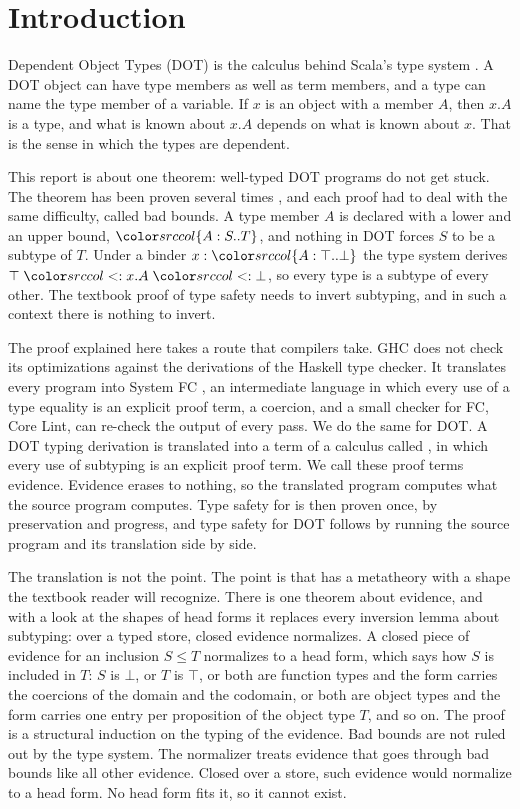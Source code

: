 \mathplain
\section{Introduction}\label{sec:intro}

Dependent Object Types (DOT) is the calculus behind Scala's type system \cite{amin2016essence}. A DOT object can have type members as well as term members, and a type can name the type member of a variable. If $x$ is an object with a member $A$, then $x.A$ is a type, and what is known about $x.A$ depends on what is known about $x$. That is the sense in which the types are dependent.

This report is about one theorem: well-typed DOT programs do not get stuck. The theorem has been proven several times \cite{amin2016essence,rompf2016soundness,rapoport2017simple,amin2017definitional,giarrusso2020scala}, and each proof had to deal with the same difficulty, called bad bounds. A type member $A$ is declared with a lower and an upper bound, $\dtyp{A}{S}{T}$, and nothing in DOT forces $S$ to be a subtype of $T$. Under a binder $x : \dtyp{A}{\top}{\bot}$ the type system derives $\top \sub x.A \sub \bot$, so every type is a subtype of every other. The textbook proof of type safety needs to invert subtyping, and in such a context there is nothing to invert.

The proof explained here takes a route that compilers take. GHC does not check its optimizations against the derivations of the Haskell type checker. It translates every program into System FC \cite{sulzmann2007fc}, an intermediate language in which every use of a type equality is an explicit proof term, a coercion, and a small checker for FC, Core Lint, can re-check the output of every pass. We do the same for DOT. A DOT typing derivation is translated into a term of a calculus called \FCdot, in which every use of subtyping is an explicit proof term. We call these proof terms evidence. Evidence erases to nothing, so the translated program computes what the source program computes. Type safety for \FCdot is then proven once, by preservation and progress, and type safety for DOT follows by running the source program and its translation side by side.

The translation is not the point. The point is that \FCdot has a metatheory with a shape the textbook reader will recognize. There is one theorem about evidence, and with a look at the shapes of head forms it replaces every inversion lemma about subtyping: over a typed store, closed evidence normalizes. A closed piece of evidence for an inclusion $S \le T$ normalizes to a head form, which says how $S$ is included in $T$: $S$ is $\bot$, or $T$ is $\top$, or both are function types and the form carries the coercions of the domain and the codomain, or both are object types and the form carries one entry per proposition of the object type $T$, and so on. The proof is a structural induction on the typing of the evidence. Bad bounds are not ruled out by the type system. The normalizer treats evidence that goes through bad bounds like all other evidence. Closed over a store, such evidence would normalize to a head form. No head form fits it, so it cannot exist.

